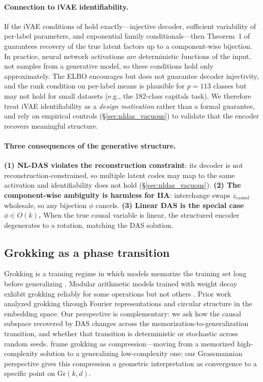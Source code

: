 \documentclass{article}
\newcommand{\Gr}{\mathrm{Gr}}
\begin{document}
\paragraph{Connection to iVAE identifiability.}
\label{prop:recovery}
If the iVAE conditions of \citet{khemakhem2020variational} hold exactly---injective
decoder, sufficient variability of per-label parameters, and exponential family
conditionals---then Theorem~1 of \citet{khemakhem2020variational} guarantees
recovery of the true latent factors up to a component-wise bijection. In
practice, neural network activations are deterministic functions of the input,
not samples from a generative model, so these conditions hold only
approximately. The ELBO encourages but does not guarantee decoder injectivity,
and the rank condition on per-label means is plausible for $p = 113$ classes
but may not hold for small datasets (e.g., the 182-class capitals task).
We therefore treat iVAE identifiability as a \emph{design motivation} rather
than a formal guarantee, and rely on empirical controls
(\S\ref{sec:nldas_vacuous}) to validate that the encoder recovers
meaningful structure.

\paragraph{Three consequences of the generative structure.}
\textbf{(1) NL-DAS violates the reconstruction constraint}:
its decoder is not reconstruction-constrained, so multiple latent codes may
map to the same activation and identifiability does not hold
(\S\ref{sec:nldas_vacuous}).
\textbf{(2) The component-wise ambiguity is harmless for IIA}:
interchange swaps $z_\text{causal}$ wholesale, so any bijection $\phi$ cancels.
\textbf{(3) Linear DAS is the special case $\phi \in O(k)$.}
When the true causal variable is linear, the structured encoder degenerates
to a rotation, matching the DAS solution.

\subsection{Grokking as a phase transition}

Grokking is a training regime in which models memorize the training set long
before generalizing \citep{power2022grokking}. Modular arithmetic models trained
with weight decay exhibit grokking reliably for some operations but not others
\citep{nanda2023progress, zhong2024clock}. Prior work analyzed grokking through
Fourier representations and circular structure in the embedding space. Our
perspective is complementary: we ask how the causal subspace recovered by DAS
changes across the memorization-to-generalization transition, and whether that
transition is deterministic or stochastic across random seeds.
\citet{liu2023grokking} frame grokking as compression---moving from a memorized
high-complexity solution to a generalizing low-complexity one; our Grassmannian
perspective gives this compression a geometric interpretation as convergence to a
specific point on $\Gr(k,d)$.
\end{document}
